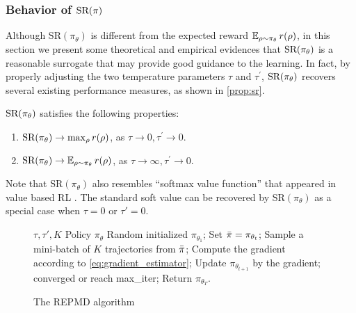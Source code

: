 \subsubsection{Behavior of $\text{SR}(\pi)$}
\label{subsec:sr}
Although $\text{SR}(\pi_\theta)$ is different from the expected reward $\operatorname*{\mathbb{E}}_{\rho \sim \pi_\theta}{r(\rho)}$,  in this section we present some theoretical and empirical evidences that $\text{SR}(\pi_\theta)$ is a reasonable surrogate that may provide good guidance to the learning. 
In fact, by properly adjusting the two temperature parameters $\tau$ and $\tau^{\prime}$, $\text{SR}(\pi_\theta)$ recovers several existing performance measures, as shown in \cref{prop:sr}.
\begin{prop}
\label{prop:sr}
$\text{SR}(\pi_\theta)$ satisfies the following properties:
\begin{enumerate}[label=(\roman*)]
	\item  $\text{SR}(\pi_\theta) \to \max_{\rho}{r(\rho)}$, as $\tau \to 0, \tau^{\prime} \to 0$.
	\item $\text{SR}(\pi_\theta) \to \operatorname*{\mathbb{E}}_{\rho \sim \pi_\theta}{r(\rho)}$, as $\tau \to \infty, \tau^{\prime} \to 0$. 
\end{enumerate}	
\end{prop}
\begin{remk}
	Note that $\text{SR}(\pi_\theta)$ also resembles ``softmax value function'' that appeared in value based RL \citep{nachum2017bridging,haarnoja2018soft,ding2017cold}. The standard soft value can be recovered by $\text{SR}(\pi_\theta)$ as a special case when $\tau = 0$ or $\tau'=0$. 
\end{remk}

\begin{wrapfigure}{r}{0.56\textwidth}
	\begin{minipage}{0.56\textwidth}
		\begin{algorithm}[H]
			\caption{\label{alg:repmd}  The REPMD algorithm}
			\begin{algorithmic}[1]
				\INPUT $\tau, \tau', K$
				\OUTPUT  Policy $\pi_\theta$
				\STATE Random initialized $\pi_{\theta_1}$;
				\STATE Set $\bar{\pi} = \pi_{\theta_t}$;
				\REPEAT 
				\STATE Sample a mini-batch of $K$ trajectories from $\bar{\pi}$;
				\STATE Compute the gradient according to \cref{eq:gradient_estimator};
				\STATE Update $\pi_{\theta_{t+1}}$ by the gradient;
				\UNTIL converged or reach max\_iter;
				\ENDFOR
				\STATE Return $\pi_{\theta_T}$.
			\end{algorithmic}
		\end{algorithm}
	\end{minipage}
\end{wrapfigure}

